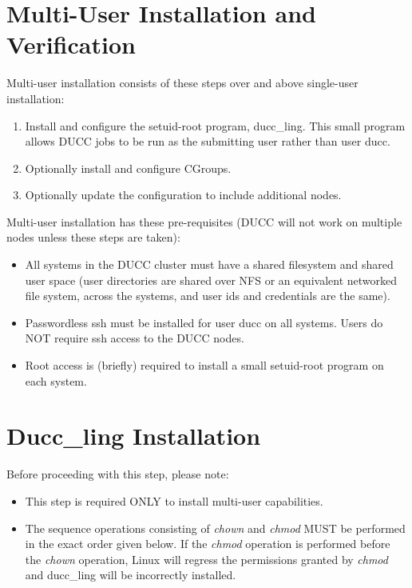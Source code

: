 \section{Multi-User Installation and Verification}
  
    Multi-user installation consists of these steps over and above single-user installation:
    \begin{enumerate}
        \item Install and configure the setuid-root program, ducc\_ling.  This small program allows DUCC
          jobs to be run as the submitting user rather than user ducc.

        \item Optionally install and configure CGroups.

        \item Optionally update the configuration to include additional nodes.
     \end{enumerate}

     Multi-user installation has these pre-requisites (DUCC will not work on multiple nodes
     unless these steps are taken):
     \begin{itemize}

         \item All systems in the DUCC cluster must have a shared filesystem and shared user space (user
           directories are shared over NFS or an equivalent networked file system, across the systems, and
           user ids and credentials are the same).

         \item Passwordless ssh must be installed for user ducc on all systems. Users do NOT require
           ssh access to the DUCC nodes.
           
         \item Root access is (briefly) required to install a small setuid-root program on each system.
      \end{itemize}

\section{Ducc\_ling Installation}
\label{sec:duccling}
    Before proceeding with this step, please note: 
    \begin{itemize}
        \item This step is required ONLY to install multi-user capabilities.
        \item The sequence operations consisting of {\em chown} and {\em chmod} MUST be performed
          in the exact order given below.  If the {\em chmod} operation is performed before
          the {\em chown} operation, Linux will regress the permissions granted by {\em chmod} 
          and ducc\_ling will be incorrectly installed.
    \end{itemize}

